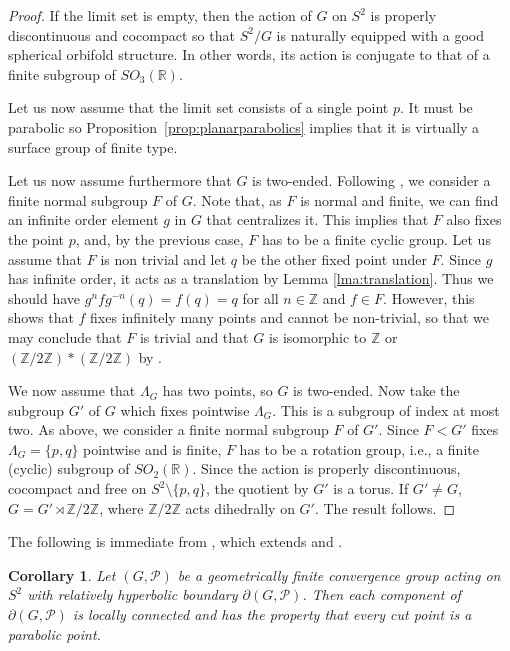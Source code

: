 \documentclass[11pt]{article}
\newtheorem{corollary}[theorem]{Corollary}
\theoremstyle{definition}
\newcommand\R{\mathbb{R}}
\newcommand\Z{\mathbb{Z}}
\begin{document}
\begin{proof} If the limit set is empty, then the action of $G$ on $S^2$ is properly discontinuous and cocompact so that $S^2/G$ is naturally equipped with a good spherical
orbifold structure. In other words,  its action is conjugate to that of a finite subgroup of $SO_3(\R)$.

Let us now assume that the limit set consists of a single point $p$. It must be parabolic so 
Proposition~\ref{prop:planarparabolics} implies that it is virtually a surface group of finite type. 

Let us now assume furthermore that $G$ is two-ended. Following \cite[Theorem 5.12]{scott:wall}, we consider a finite normal subgroup $F$ of $G$. Note that, as $F$ is normal and finite, we can find an infinite order element $g$ in $G$ that centralizes it. This implies that $F$ also fixes the point $p$, and, by the previous case, $F$ has to be a finite cyclic group. 
Let us assume that $F$ is non trivial and let $q$ be the other fixed point under $F$. Since $g$ has
infinite order, it acts as a translation by Lemma \ref{lma:translation}. Thus we should have $g^n f g^{-n}(q)=f(q)=q$ for all $n\in\Z$ and $f\in F$. However, this shows that $f$ fixes infinitely many points and cannot be non-trivial, 
so that we may conclude that $F$ is 
trivial and that $G$ is isomorphic to $\Z$ or $(\Z/2\Z)*(\Z/2\Z)$ by \cite[Theorem 5.12 (iii)]{scott:wall}. 

We now assume that $\Lambda_G$ has two points, so $G$  is two-ended. Now take the subgroup $G'$ of $G$ which fixes pointwise $\Lambda_G$. This is a subgroup of index at most two. As above, we consider a finite normal subgroup $F$ of $G'$. 
Since $F<G'$ fixes $\Lambda_G=\{p,q\}$ pointwise and is finite, $F$ has to be a rotation group, 
i.e., a finite (cyclic) subgroup of $SO_2(\R)$.
Since the action is properly discontinuous, cocompact and free on $S^2\setminus\{p,q\}$, the quotient by $G'$
is a torus. If $G' \neq G$, $G = G' \rtimes \mathbb{Z}/2\mathbb{Z}$, where $\mathbb{Z}/2\mathbb{Z}$ acts dihedrally on $G'$. The result follows.
 \end{proof}





The following is immediate from \cite{Dasgupta:Hruska}, which extends \cite[Thm\,0.1]{bowbound} and \cite[Thm\,0.2]{bowconnect}. 


\begin{corollary}\label{cor:lc}
Let $(G, \mathcal{P})$ be a geometrically finite convergence group acting on $S^2$ with relatively hyperbolic boundary $\partial(G, \mathcal{P})$.  Then each component of $\partial(G, \mathcal{P})$ is locally connected and has the property that every cut point  is a parabolic point.
\end{corollary} 
\end{document}
